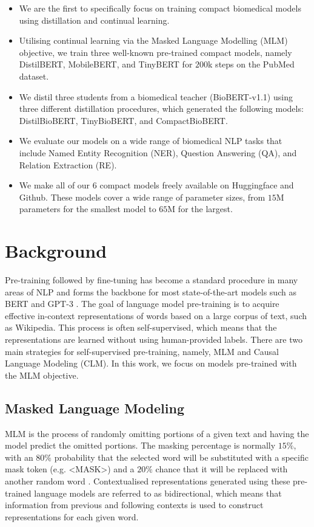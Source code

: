 \documentclass{article}
\begin{document}
\begin{itemize}
    \item We are the first to specifically focus on training compact biomedical models using distillation and continual learning.
    \item Utilising continual learning via the Masked Language Modelling (MLM) objective, we train three well-known pre-trained compact models, namely DistilBERT, MobileBERT, and TinyBERT for $200$k steps on the PubMed dataset.
    \item We distil three students from a biomedical teacher (BioBERT-v1.1) using three different distillation procedures, which generated the following models: DistilBioBERT, TinyBioBERT, and CompactBioBERT. 
    \item We evaluate our models on a wide range of biomedical NLP tasks that include Named Entity Recognition (NER), Question Answering (QA), and Relation Extraction (RE).    
    \item We make all of our $6$ compact models freely available on Huggingface and Github. These models cover a wide range of parameter sizes, from $15$M parameters for the smallest model to $65$M for the largest. 
\end{itemize}



\section{Background}

Pre-training followed by fine-tuning has become a standard procedure in many areas of NLP and forms the backbone for most state-of-the-art models such as BERT \citep{devlin-etal-2019-bert} and GPT-3 \citep{brown2020language}. The goal of language model pre-training is to acquire effective in-context representations of words based on a large corpus of text, such as Wikipedia. This process is often self-supervised, which means that the representations are learned without using human-provided labels. There are two main strategies for self-supervised pre-training, namely, MLM and Causal Language Modeling (CLM). In this work, we focus on models pre-trained with the MLM objective. 

\subsection{Masked Language Modeling}
MLM is the process of randomly omitting portions of a given text and having the model predict the omitted portions. The masking percentage is normally $15\%$, with an $80\%$ probability that the selected word will be substituted with a specific mask token (e.g. <MASK>) and a $20\%$ chance that it will be replaced with another random word \citep{devlin-etal-2019-bert}. Contextualised representations generated using these pre-trained language models are referred to as bidirectional, which means that information from previous and following contexts is used to construct representations for each given word.
\end{document}
